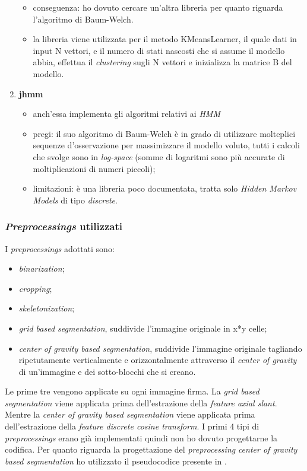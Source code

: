 \begin{enumerate}
\begin{itemize}
	\item conseguenza: ho dovuto cercare un'altra libreria per quanto riguarda l'algoritmo di Baum-Welch.
	\item la libreria viene utilizzata per il metodo KMeansLearner, il quale dati in input N vettori, e il numero di stati nascosti che si assume il modello abbia, effettua il \emph{clustering} sugli N vettori e inizializza la matrice B del modello.
	\end{itemize}
\item\textbf{jhmm}
	\begin{itemize}
	\item anch'essa implementa gli algoritmi relativi ai \emph{HMM}
	\item pregi: il suo algoritmo di Baum-Welch è in grado di utilizzare molteplici sequenze d'osservazione per massimizzare il modello voluto, tutti i calcoli che svolge sono in \emph{log-space} (somme di logaritmi sono più accurate di moltiplicazioni di numeri piccoli);
	\item limitazioni: è una libreria poco documentata, tratta solo \emph{Hidden Markov Models} di tipo \emph{discrete}.
	\end{itemize}
\end{enumerate}
\subsubsection*{\emph{Preprocessings} utilizzati}
\label{3.3.3.6} I \emph{preprocessings} adottati sono:
\begin{itemize}
\item \emph{binarization};
\item \emph{cropping};
\item \emph{skeletonization};
\item \emph{grid based segmentation}, suddivide l'immagine originale in x*y celle;
\item \emph{center of gravity based segmentation}, suddivide l'immagine originale tagliando ripetutamente verticalmente e orizzontalmente attraverso il \emph{\gls{center of gravity}} di un'immagine e dei sotto-blocchi che si creano\cite{5}.
\end{itemize}
Le prime tre vengono applicate su ogni immagine firma. La \emph{grid based segmentation} viene applicata prima dell'estrazione della \emph{feature axial slant}. Mentre la \emph{center of gravity based segmentation} viene applicata prima dell'estrazione della \emph{feature discrete cosine transform}. I primi 4 tipi di \emph{preprocessings} erano già implementati quindi non ho dovuto progettarne la codifica. Per quanto riguarda la progettazione del \emph{preprocessing} \emph{center of gravity based segmentation} ho utilizzato il pseudocodice presente in \cite{5}.

